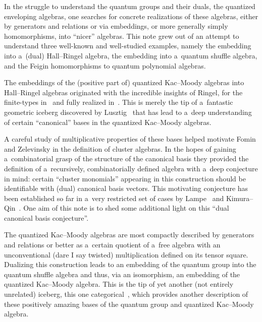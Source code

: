 \documentclass[pdftex]{sigma}
\numberwithin{equation}{section}
\begin{document}
In the struggle to understand the quantum groups and their duals, the quantized enveloping algebras, one searches for
concrete realizations of these algebras, either by generators and relations or via embeddings, or more generally simply
homomorphisms, into ``nicer'' algebras.
This note grew out of an attempt to understand three well-known and well-studied examples, namely the embedding into
a~(dual) Hall--Ringel algebra, the embedding into a~quantum shuf\/f\/le algebra, and the Feigin homomorphisms to quantum
polynomial algebras.

The embeddings of the (positive part of) quantized Kac--Moody algebras into Hall--Ringel algebras originated with the
incredible insights of Ringel, for the f\/inite-types in~\cite{ringel2} and fully realized in~\cite{ringel3}.
This is merely the tip of a~fantastic geometric iceberg discovered by Lusztig~\cite{lusztig} that has lead to a~deep
understanding of certain ``canonical'' bases in the quantized Kac--Moody algebras.

A careful study of multiplicative properties of these bases helped motivate Fomin and Zele\-vinsky in the def\/inition of
cluster algebras.
In the hopes of gaining a~combinatorial grasp of the structure of the canonical basis they provided the def\/inition of
a~recursively, combinatorially def\/ined algebra with a~deep conjecture in mind: certain ``cluster monomials'' appearing
in this construction should be identif\/iable with (dual) canonical basis vectors.
This motivating conjecture has been established so far in a~very restricted set of cases by Lampe~\cite{lampe1,lampe2}
and Kimura--Qin~\cite{kimura-qin}.
One aim of this note is to shed some additional light on this ``dual canonical basis conjecture''.

The quantized Kac--Moody algebras are most compactly described by generators and relations or better as a~certain
quotient of a~free algebra with an unconventional (dare I say twisted) multiplication def\/ined on its tensor square.
Dualizing this construction leads to an embedding of the quantum group into the quantum shuf\/f\/le algebra and thus, via an
isomorphism, an embedding of the quantized Kac--Moody algebra.
This is the tip of yet another (not entirely unrelated) iceberg, this one
categorical~\cite{khovanov-lauda1,khovanov-lauda2,rouquier1,rouquier2}, which provides another description of these
positively amazing bases of the quantum group and quantized Kac--Moody algebra.
\end{document}
